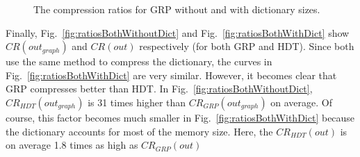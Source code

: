 \begin{figure}[h]
	\centering
	\hfill
	\caption{The compression ratios for GRP without and with dictionary sizes.}
\end{figure}

Finally, Fig.~\ref{fig:ratiosBothWithoutDict} and Fig.~\ref{fig:ratiosBothWithDict} show $CR(out_{graph})$ and $CR(out)$ respectively (for both GRP and HDT). Since both use the same method to compress the dictionary, the curves in Fig.~\ref{fig:ratiosBothWithDict} are very similar. However, it becomes clear that GRP compresses better than HDT. In Fig.~\ref{fig:ratiosBothWithoutDict}, $CR_{HDT}(out_{graph})$ is 31 times higher than $CR_{GRP}(out_{graph})$ on average. Of course, this factor becomes much smaller in Fig.~\ref{fig:ratiosBothWithDict} because the dictionary accounts for most of the memory size. Here, the $CR_{HDT}(out)$ is on average 1.8 times as high as $CR_{GRP}(out)$

